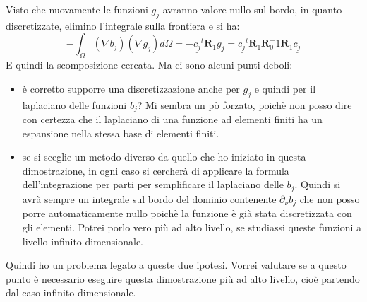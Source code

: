 \documentclass[a4paper,12pt]{report}				%
\begin{document}
Visto che nuovamente le funzioni $g_j$ avranno valore nullo sul bordo, in quanto discretizzate, elimino l'integrale sulla frontiera e si ha:
$$
-\int_{\Omega} (\nabla b_j)(\nabla g_j)d\Omega=-\underline{c_j}^t\mathbf{R}_1\underline{g_j}=\underline{c_j}^t\mathbf{R}_1\mathbf{R}_0^-1\mathbf{R}_1\underline{c_j}
$$
E quindi la scomposizione cercata. Ma ci sono alcuni punti deboli:
\begin{itemize}
\item è corretto supporre una discretizzazione anche per $g_j$ e quindi per il laplaciano delle funzioni $b_j$? Mi sembra un pò forzato, poichè non posso dire con certezza che il laplaciano di una funzione ad elementi finiti ha un espansione nella stessa base di elementi finiti.
\item se si sceglie un metodo diverso da quello che ho iniziato in questa dimostrazione, in ogni caso si cercherà di applicare la formula dell'integrazione per parti per semplificare il laplaciano delle $b_j$. Quindi si avrà sempre un integrale sul bordo del dominio contenente $\partial_{\nu}b_j$ che non posso porre automaticamente nullo poichè la funzione è già stata discretizzata con gli elementi. Potrei porlo vero più ad alto livello, se studiassi queste funzioni a livello infinito-dimensionale.
\end{itemize}
Quindi ho un problema legato a queste due ipotesi. Vorrei valutare se a questo punto è necessario eseguire questa dimostrazione più ad alto livello, cioè partendo dal caso infinito-dimensionale.
\end{document}

